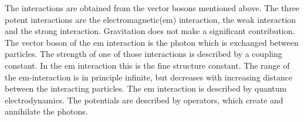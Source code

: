 The interactions are obtained from the vector bosons mentioned above.
The three potent interactions are the electromagnetic(em) interaction,
the weak interaction and the strong interaction. Gravitation does not make a significant contribution.
The vector boson of the em interaction is the photon which is exchanged between particles.
The strength of one of those interactions is
described by a coupling constant. In the em interaction this is the
fine structure constant\cite{alphas}. The range of the em-interaction is in principle
infinite, but decreases with increasing distance between the interacting particles.
The em interaction is described by quantum electrodynamics.
The potentials are described by operators, which create and annihilate the photons.

